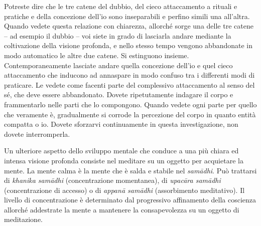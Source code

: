 Potreste dire che le tre catene del dubbio, del cieco attaccamento a
rituali e pratiche e della concezione dell'io sono inseparabili e
perfino simili una all'altra. Quando vedete questa relazione con
chiarezza, allorché sorge una delle tre catene -- ad esempio il dubbio
-- voi siete in grado di lasciarla andare mediante la coltivazione della
visione profonda, e nello stesso tempo vengono abbandonate in modo
automatico le altre due catene. Si estinguono insieme.
Contemporaneamente lasciate andare quella concezione dell'io e quel
cieco attaccamento che inducono ad annaspare in modo confuso tra i
differenti modi di praticare. Le vedete come facenti parte del
complessivo attaccamento al senso del sé, che deve essere abbandonato.
Dovete ripetutamente indagare il corpo e frammentarlo nelle parti che lo
compongono. Quando vedete ogni parte per quello che veramente è,
gradualmente si corrode la percezione del corpo in quanto entità
compatta o io. Dovete sforzarvi continuamente in questa investigazione,
non dovete interromperla.

Un ulteriore aspetto dello sviluppo mentale che conduce a una più chiara
ed intensa visione profonda consiste nel meditare su un oggetto per
acquietare la mente. La mente calma è la mente che è salda e stabile nel
\emph{samādhi}. Può trattarsi di \emph{khanika samādhi} (concentrazione
momentanea), di \emph{upacāra samādhi} (concentrazione di accesso) o di
\emph{appanā samādhi} (assorbimento meditativo). Il livello di
concentrazione è determinato dal progressivo affinamento della coscienza
allorché addestrate la mente a mantenere la consapevolezza su un oggetto
di meditazione.

